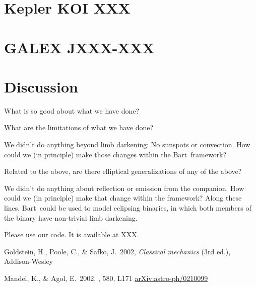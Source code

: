 \documentclass[12pt,preprint]{aastex}
\newcommand{\project}[1]{{\sffamily #1}}
\newcommand{\bart}{\project{Bart}}
\begin{document}
\section{Kepler KOI XXX}

\section{GALEX JXXX-XXX}

\section{Discussion}

What is so good about what we have done?

What are the limitations of what we have done?

We didn't do anything beyond limb darkening:  No sunspots or convection.
How could we (in principle) make those changes within the \bart\ framework?

Related to the above, are there elliptical generalizations of any of the above?

We didn't do anything about reflection or emission from the companion.
How could we (in principle) make that change within the framework?
Along these lines, \bart\ could be used to model eclipsing binaries,
in which both members of the binary have non-trivial limb darkening.

Please use our code.  It is available at XXX.

\acknowledgments


\newcommand{\arxiv}[1]{\href{http://arxiv.org/abs/#1}{arXiv:#1}}
\begin{thebibliography}{}\raggedright

    Goldstein, H., Poole, C., \& Safko, J.\ 2002, \emph{Classical mechanics}
    (3rd ed.), Addison-Wesley

        Mandel, K., \& Agol, E.\ 2002, \apjl, 580, L171
        \arxiv{astro-ph/0210099}

\end{thebibliography}


\clearpage


\end{document}
